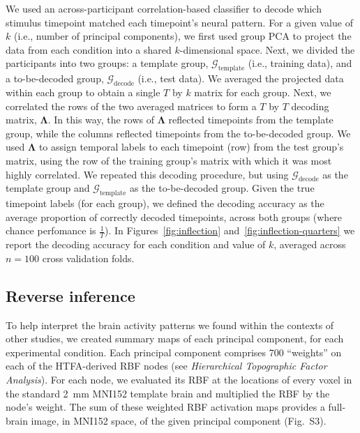 \documentclass[english, 11pt]{article}
\newcommand{\componentBrains}{S3}
\begin{document}
We used an across-participant correlation-based classifier to decode which
stimulus timepoint matched each timepoint's neural pattern. For a given value
of $k$ (i.e., number of principal components), we first used group PCA to
project the data from each condition into a shared $k$-dimensional space. Next,
we divided the participants into two groups: a template group,
$\mathcal{G}_{\mathrm{template}}$ (i.e., training data), and a to-be-decoded
group, $\mathcal{G}_{\mathrm{decode}}$ (i.e., test data). We averaged the
projected data within each group to obtain a single $T$ by $k$ matrix for each
group. Next, we correlated the rows of the two averaged matrices to form a $T$
by $T$ decoding matrix, $\mathbf{\Lambda}$. In this way, the rows of
$\mathbf{\Lambda}$ reflected timepoints from the template group, while the
columns reflected timepoints from the to-be-decoded group. We used
$\mathbf{\Lambda}$ to assign temporal labels to each timepoint (row) from the
test group's matrix, using the row of the training group's matrix with which it
was most highly correlated. We repeated this decoding procedure, but using
$\mathcal{G}_{\mathrm{decode}}$ as the template group and
$\mathcal{G}_{\mathrm{template}}$ as the to-be-decoded group. Given the true
timepoint labels (for each group), we defined the decoding accuracy as the
average proportion of correctly decoded timepoints, across both groups (where
chance perfomance is $\frac{1}{T}$). In Figures~\ref{fig:inflection}
and~\ref{fig:inflection-quarters} we report the decoding accuracy for each
condition and value of $k$, averaged across $n = 100$ cross validation folds.

\subsection*{Reverse inference}

To help interpret the brain activity patterns we found within the contexts of
other studies, we created summary maps of each principal component, for each
experimental condition. Each principal component comprises 700 ``weights'' on
each of the HTFA-derived RBF nodes (see \textit{Hierarchical Topographic Factor
Analysis}). For each node, we evaluated its RBF at the locations of every voxel
in the standard 2~mm MNI152 template brain and multiplied the RBF by the node's
weight. The sum of these weighted RBF activation maps provides a full-brain
image, in MNI152 space, of the given principal component (Fig.~\componentBrains).
\end{document}
